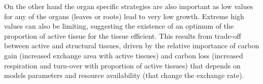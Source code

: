 \begin{figure}%
    \classiccaptionstyle
{}
\end{figure}

On the other hand the organ specific strategies are also important as low values for any of the organs (leaves or roots) lead to very low growth. Extreme high values can also be limiting, suggesting the existence of an optimum of the proportion of active tissue for the tissue efficient. This  results from trade-off between active and structural tissues, driven by the relative importance of carbon gain (increased exchange area with active tissues) and carbon loss (increased respiration and turn-over with proportion of active tissues) that depends on models parameters and resource availability (that change the exchange rate).

